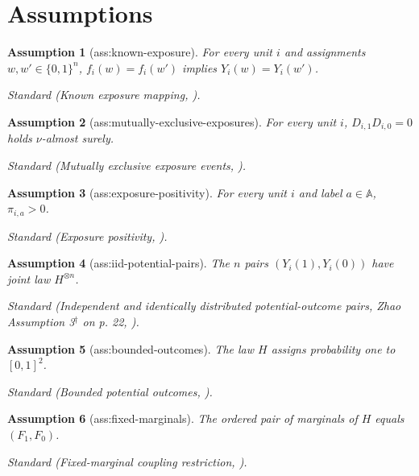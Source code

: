\documentclass{article}
\newtheorem{assumption}{Assumption}
\begin{document}
\section{Assumptions}

\begin{assumption}[ass:known-exposure]\label{ass:known-exposure}
For every unit \(i\) and assignments \(w,w'\in\{0,1\}^n\), \(f_i(w)=f_i(w')\) implies \(Y_i(w)=Y_i(w')\).
\par\smallskip\noindent\emph{Standard} (Known exposure mapping, \cite{AronowSamii2017}).
\end{assumption}

\begin{assumption}[ass:mutually-exclusive-exposures]\label{ass:mutually-exclusive-exposures}
For every unit \(i\), \(D_{i,1}D_{i,0}=0\) holds \(\nu\)-almost surely.
\par\smallskip\noindent\emph{Standard} (Mutually exclusive exposure events, \cite{Zhao2026OptimalControlVariates}).
\end{assumption}

\begin{assumption}[ass:exposure-positivity]\label{ass:exposure-positivity}
For every unit \(i\) and label \(a\in\mathbb A\), \(\pi_{i,a}>0\).
\par\smallskip\noindent\emph{Standard} (Exposure positivity, \cite{AronowSamii2017}).
\end{assumption}

\begin{assumption}[ass:iid-potential-pairs]\label{ass:iid-potential-pairs}
The \(n\) pairs \((Y_i(1),Y_i(0))\) have joint law \(H^{\otimes n}\).
\par\smallskip\noindent\emph{Standard} (Independent and identically distributed potential-outcome pairs, Zhao Assumption 3\(^{\dagger}\) on p. 22, \cite{Zhao2026OptimalControlVariates}).
\end{assumption}

\begin{assumption}[ass:bounded-outcomes]\label{ass:bounded-outcomes}
The law \(H\) assigns probability one to \([0,1]^2\).
\par\smallskip\noindent\emph{Standard} (Bounded potential outcomes, \cite{AronowGreenLee2014SharpVariance}).
\end{assumption}

\begin{assumption}[ass:fixed-marginals]\label{ass:fixed-marginals}
The ordered pair of marginals of \(H\) equals \((F_1,F_0)\).
\par\smallskip\noindent\emph{Standard} (Fixed-marginal coupling restriction, \cite{Bergin1999RestrictedMarginals}).
\end{assumption}
\end{document}
